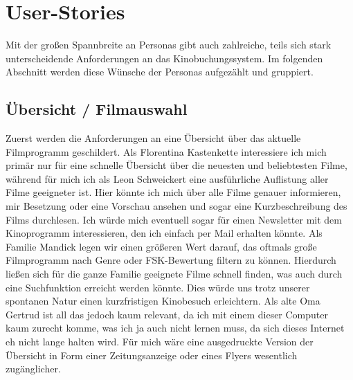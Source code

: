 \section{User-Stories}

Mit der großen Spannbreite an Personas gibt auch zahlreiche, teils sich stark unterscheidende Anforderungen an das Kinobuchungssystem. Im folgenden Abschnitt werden diese Wünsche der Personas aufgezählt und gruppiert.

\subsection{Übersicht / Filmauswahl}
Zuerst werden die Anforderungen an eine Übersicht über das aktuelle Filmprogramm geschildert. Als Florentina Kastenkette interessiere ich mich primär nur für eine schnelle Übersicht über die neuesten und beliebtesten Filme, während für mich ich als Leon Schweickert eine ausführliche Auflistung aller Filme geeigneter ist. Hier könnte ich mich über alle Filme genauer informieren, mir Besetzung oder eine Vorschau ansehen und sogar eine Kurzbeschreibung des Films durchlesen. Ich würde mich eventuell sogar für einen Newsletter mit dem Kinoprogramm interessieren, den ich einfach per Mail erhalten könnte. Als Familie Mandick legen wir einen größeren Wert darauf, das oftmals große Filmprogramm nach Genre oder FSK-Bewertung filtern zu können. Hierdurch ließen sich für die ganze Familie geeignete Filme schnell finden, was auch durch eine Suchfunktion erreicht werden könnte. Dies würde uns trotz unserer spontanen Natur einen kurzfristigen Kinobesuch erleichtern. Als alte Oma Gertrud ist all das jedoch kaum relevant, da ich mit einem dieser Computer kaum zurecht komme, was ich ja auch nicht lernen muss, da sich dieses Internet eh nicht lange halten wird. Für mich wäre eine ausgedruckte Version der Übersicht in Form einer Zeitungsanzeige oder eines Flyers wesentlich zugänglicher.

